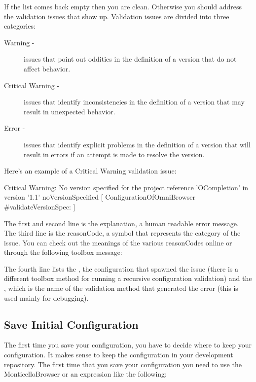 \documentclass[a4paper,10pt,twoside]{book}
\begin{document}
If the list comes back empty then you are clean. Otherwise you should address the validation issues that show up. Validation issues are divided into three categories:

\begin{description}
\item[Warning -] issues that point out oddities in the definition of a version that do not affect behavior.
\item[Critical Warning -] issues that identify inconsistencies in the definition of a version that may result in unexpected behavior.
\item[ Error -] issues that identify explicit problems in the definition of a version that will result in errors if an attempt is made to resolve the version.
\end{description}

Here's an example of a Critical Warning validation issue:
\begin{code}{}
Critical Warning: No version specified for the project reference 'OCompletion'
            in version '1.1'
    { noVersionSpecified }
    [ ConfigurationOfOmniBrowser #validateVersionSpec: ]
\end{code}    

The first and second line is the explanation, a human readable error message. The third line is the reasonCode, a symbol that represents the category of the issue. You can check out the meanings of the various reasonCodes online or through the following toolbox message:

The fourth line lists the , \ie the configuration that spawned the issue (there is a different toolbox method for running a recursive configuration validation) and the , which is the name of the validation method that generated the error (this is used mainly for debugging).



\subsection{Save Initial Configuration}

The first time you save your configuration, you have to decide where to keep your configuration. It makes sense to keep the configuration in your development repository. The first time that you save your configuration you need to use the MonticelloBrowser or an expression like the following:
\end{document}
